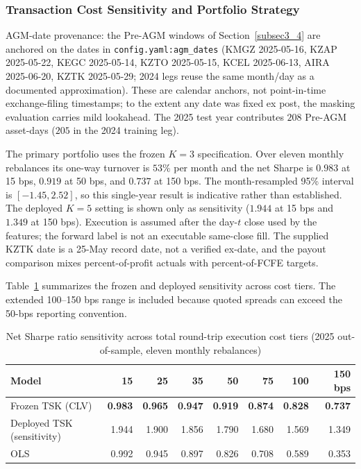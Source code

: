 \documentclass[pdflatex,sn-mathphys-num]{sn-jnl}
\theoremstyle{thmstyleone}
\theoremstyle{thmstyletwo}
\theoremstyle{thmstylethree}
\begin{document}
\subsubsection{Transaction Cost Sensitivity and Portfolio Strategy}\label{subsubsec4_3_1}

AGM-date provenance: the Pre-AGM windows of Section~\ref{subsec3_4} are anchored on the dates in \texttt{config.yaml:agm\_dates} (KMGZ 2025-05-16, KZAP 2025-05-22, KEGC 2025-05-14, KZTO 2025-05-15, KCEL 2025-06-13, AIRA 2025-06-20, KZTK 2025-05-29; 2024 legs reuse the same month/day as a documented approximation). These are calendar anchors, not point-in-time exchange-filing timestamps; to the extent any date was fixed ex post, the masking evaluation carries mild lookahead. The 2025 test year contributes $208$ Pre-AGM asset-days ($205$ in the 2024 training leg).

The primary portfolio uses the frozen $K=3$ specification. Over eleven monthly rebalances its one-way turnover is $53\%$ per month and the net Sharpe is $0.983$ at 15 bps, $0.919$ at 50 bps, and $0.737$ at 150 bps. The month-resampled 95\% interval is $[-1.45,2.52]$, so this single-year result is indicative rather than established. The deployed $K=5$ setting is shown only as sensitivity ($1.944$ at 15 bps and $1.349$ at 150 bps). Execution is assumed after the day-$t$ close used by the features; the forward label is not an executable same-close fill. The supplied KZTK date is a 25-May record date, not a verified ex-date, and the payout comparison mixes percent-of-profit actuals with percent-of-FCFE targets.

Table~\ref{tab:tcost_sensitivity} summarizes the frozen and deployed sensitivity across cost tiers. The extended 100--150 bps range is included because quoted spreads can exceed the 50-bps reporting convention.

\begin{table}[htbp]
\centering
\small
\caption{Net Sharpe ratio sensitivity across total round-trip execution cost tiers (2025 out-of-sample, eleven monthly rebalances)}
\label{tab:tcost_sensitivity}
\begin{tabular}{@{}lrrrrrrr@{}}
\toprule
\textbf{Model} & \textbf{15} & \textbf{25} & \textbf{35} & \textbf{50} & \textbf{75} & \textbf{100} & \textbf{150 bps} \\
\midrule
Frozen TSK (CLV) & \textbf{0.983} & \textbf{0.965} & \textbf{0.947} & \textbf{0.919} & \textbf{0.874} & \textbf{0.828} & \textbf{0.737} \\
Deployed TSK (sensitivity) & 1.944 & 1.900 & 1.856 & 1.790 & 1.680 & 1.569 & 1.349 \\
OLS                & 0.992          & 0.945          & 0.897          & 0.826 & 0.708 & 0.589 & 0.353 \\
\bottomrule
\end{tabular}
\end{table}
\end{document}
